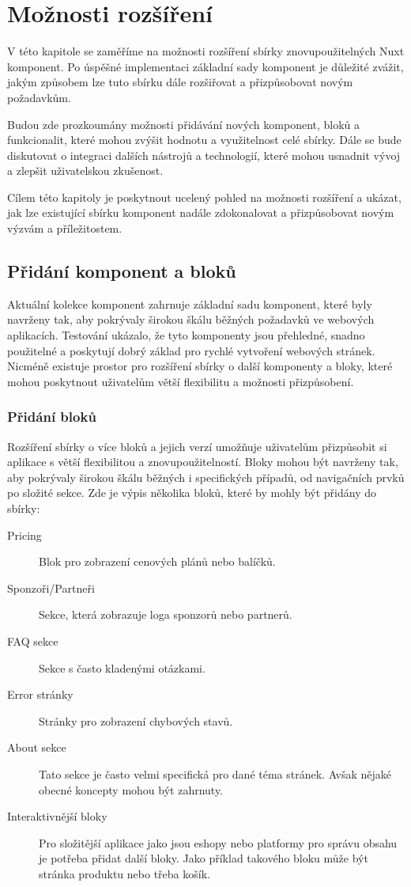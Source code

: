 
\chapter{Možnosti rozšíření}

V této kapitole se zaměříme na možnosti rozšíření sbírky znovupoužitelných Nuxt komponent. Po úspěšné implementaci základní sady komponent je důležité zvážit, jakým způsobem lze tuto sbírku dále rozšiřovat a přizpůsobovat novým požadavkům.

Budou zde prozkoumány možnosti přidávání nových komponent, bloků a funkcionalit, které mohou zvýšit hodnotu a využitelnost celé sbírky. Dále se bude diskutovat o integraci dalších nástrojů a technologií, které mohou usnadnit vývoj a zlepšit uživatelskou zkušenost.

Cílem této kapitoly je poskytnout ucelený pohled na možnosti rozšíření a ukázat, jak lze existující sbírku komponent nadále zdokonalovat a přizpůsobovat novým výzvám a příležitostem.

\section{Přidání komponent a bloků}
Aktuální kolekce komponent zahrnuje základní sadu komponent, které byly navrženy tak, aby pokrývaly širokou škálu běžných požadavků ve webových aplikacích. Testování ukázalo, že tyto komponenty jsou přehledné, snadno použitelné a poskytují dobrý základ pro rychlé vytvoření webových stránek. Nicméně existuje prostor pro rozšíření sbírky o další komponenty a bloky, které mohou poskytnout uživatelům větší flexibilitu a možnosti přizpůsobení.

\subsection{Přidání bloků}
Rozšíření sbírky o více bloků a jejich verzí umožňuje uživatelům přizpůsobit si aplikace s větší flexibilitou a znovupoužitelností. Bloky mohou být navrženy tak, aby pokrývaly širokou škálu běžných i specifických případů, od navigačních prvků po složité sekce. Zde je výpis několika bloků, které by mohly být přidány do sbírky:

\begin{description}
  \item[Pricing] Blok pro zobrazení cenových plánů nebo balíčků.
  \item[Sponzoři/Partneři] Sekce, která zobrazuje loga sponzorů nebo partnerů.
  \item[FAQ sekce] Sekce s často kladenými otázkami.
  \item[Error stránky] Stránky pro zobrazení chybových stavů.
  \item[About sekce] Tato sekce je často velmi specifická pro dané téma stránek. Avšak nějaké obecné koncepty mohou být zahrnuty.
  \item[Interaktivnější bloky] Pro složitější aplikace jako jsou eshopy nebo platformy pro správu obsahu je potřeba přidat další bloky. Jako příklad takového bloku může být stránka produktu nebo třeba košík.
\end{description}

